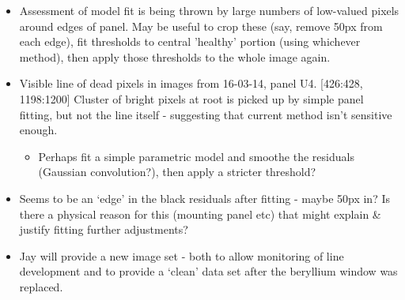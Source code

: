 \documentclass[10pt,fleqn]{article}
\begin{document}
\begin{itemize}
\item Assessment of model fit is being thrown by large numbers of low-valued pixels around edges of panel. May be useful to crop these (say, remove 50px from each edge), fit thresholds to central 'healthy' portion (using whichever method), then apply those thresholds to the whole image again.

\item Visible line of dead pixels in images from 16-03-14, panel U4. [426:428, 1198:1200] Cluster of bright pixels at root is picked up by simple panel fitting, but not the line itself - suggesting that current method isn't sensitive enough.
\begin{itemize}
	\item Perhaps fit a simple parametric model and smoothe the residuals (Gaussian convolution?), then apply a stricter threshold?
\end{itemize}

\item Seems to be an `edge' in the black residuals after fitting - maybe 50px in? Is there a physical reason for this (mounting panel etc) that might explain \& justify fitting further adjustments?

\item Jay will provide a new image set - both to allow monitoring of line development and to provide a `clean' data set after the beryllium window was replaced.

\end{itemize}
\end{document}

